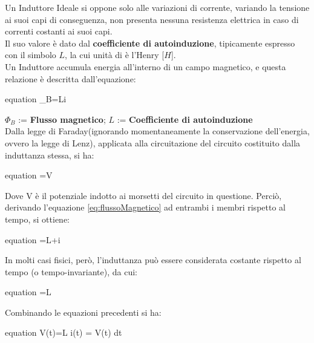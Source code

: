 \begin{de}
	Un Induttore Ideale si oppone solo alle variazioni di corrente, variando la tensione ai suoi capi di conseguenza, non presenta nessuna resistenza elettrica in caso di correnti costanti ai suoi capi.\\
	Il suo valore è dato dal \textbf{coefficiente di autoinduzione}, tipicamente espresso con il simbolo $L$, la cui unità di è l'Henry [$H$].\\
	Un Induttore accumula energia all'interno di un campo magnetico, e questa relazione è descritta dall'equazione:
	\begin{empheq}[box=\mathStep]{equation} \label{eq:flussoMagnetico}
		\Phi _{B}=Li
	\end{empheq}
	$ \Phi _{B} $ := \textbf{Flusso magnetico}; $L$ := \textbf{Coefficiente di autoinduzione}\\
	Dalla legge di Faraday(ignorando momentaneamente la conservazione dell'energia, ovvero la legge di Lenz), applicata alla circuitazione del circuito costituito dalla induttanza stessa, si ha:
	\begin{empheq}[box=\mathStep]{equation}
		=V
	\end{empheq}
	Dove V è il potenziale indotto ai morsetti del circuito in questione. Perciò, derivando l'equazione \ref{eq:flussoMagnetico} ad entrambi i membri rispetto al tempo, si ottiene:
	\begin{empheq}[box=\mathStep]{equation}
		\displaystyle {}=L{}+i{}
	\end{empheq}
	In molti casi fisici, però, l'induttanza può essere considerata costante rispetto al tempo (o tempo-invariante), da cui:
	\begin{empheq}[box=\mathStep]{equation}
		=L{}
	\end{empheq}
	Combinando le equazioni precedenti si ha:
	\begin{empheq}[box=\mathCalc]{equation}
		{\displaystyle V(t)={L{}}} \Leftrightarrow i(t) =  \int V(t) dt
	\end{empheq}
\end{de}


